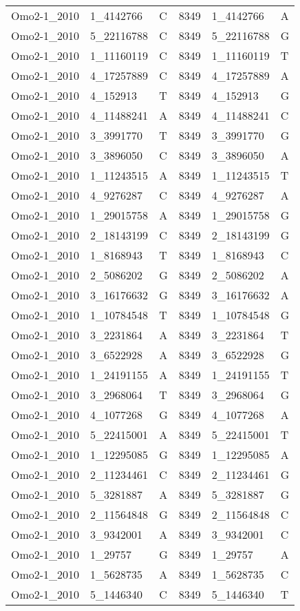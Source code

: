 \begin{center}
\begin{longtable}{|l|l|l|l|l|l|}
Omo2-1\_2010&1\_4142766&C&8349&1\_4142766&A\\
Omo2-1\_2010&5\_22116788&C&8349&5\_22116788&G\\
Omo2-1\_2010&1\_11160119&C&8349&1\_11160119&T\\
Omo2-1\_2010&4\_17257889&C&8349&4\_17257889&A\\
Omo2-1\_2010&4\_152913&T&8349&4\_152913&G\\
Omo2-1\_2010&4\_11488241&A&8349&4\_11488241&C\\
Omo2-1\_2010&3\_3991770&T&8349&3\_3991770&G\\
Omo2-1\_2010&3\_3896050&C&8349&3\_3896050&A\\
Omo2-1\_2010&1\_11243515&A&8349&1\_11243515&T\\
Omo2-1\_2010&4\_9276287&C&8349&4\_9276287&A\\
Omo2-1\_2010&1\_29015758&A&8349&1\_29015758&G\\
Omo2-1\_2010&2\_18143199&C&8349&2\_18143199&G\\
Omo2-1\_2010&1\_8168943&T&8349&1\_8168943&C\\
Omo2-1\_2010&2\_5086202&G&8349&2\_5086202&A\\
Omo2-1\_2010&3\_16176632&G&8349&3\_16176632&A\\
Omo2-1\_2010&1\_10784548&T&8349&1\_10784548&G\\
Omo2-1\_2010&3\_2231864&A&8349&3\_2231864&T\\
Omo2-1\_2010&3\_6522928&A&8349&3\_6522928&G\\
Omo2-1\_2010&1\_24191155&A&8349&1\_24191155&T\\
Omo2-1\_2010&3\_2968064&T&8349&3\_2968064&G\\
Omo2-1\_2010&4\_1077268&G&8349&4\_1077268&A\\
Omo2-1\_2010&5\_22415001&A&8349&5\_22415001&T\\
Omo2-1\_2010&1\_12295085&G&8349&1\_12295085&A\\
Omo2-1\_2010&2\_11234461&C&8349&2\_11234461&G\\
Omo2-1\_2010&5\_3281887&A&8349&5\_3281887&G\\
Omo2-1\_2010&2\_11564848&G&8349&2\_11564848&C\\
Omo2-1\_2010&3\_9342001&A&8349&3\_9342001&C\\
Omo2-1\_2010&1\_29757&G&8349&1\_29757&A\\
Omo2-1\_2010&1\_5628735&A&8349&1\_5628735&C\\
Omo2-1\_2010&5\_1446340&C&8349&5\_1446340&T\\

\end{longtable}
\end{center}

